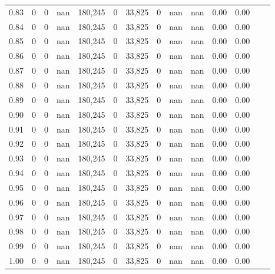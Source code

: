 \begin{tabular}{rrrrrrrrrrrrrr}
0.83 &      0 &      0 &     nan &  180,245 &        0 &  33,825 &       0 &   nan &   nan &  0.00 &      0.00 \\
0.84 &      0 &      0 &     nan &  180,245 &        0 &  33,825 &       0 &   nan &   nan &  0.00 &      0.00 \\
0.85 &      0 &      0 &     nan &  180,245 &        0 &  33,825 &       0 &   nan &   nan &  0.00 &      0.00 \\
0.86 &      0 &      0 &     nan &  180,245 &        0 &  33,825 &       0 &   nan &   nan &  0.00 &      0.00 \\
0.87 &      0 &      0 &     nan &  180,245 &        0 &  33,825 &       0 &   nan &   nan &  0.00 &      0.00 \\
0.88 &      0 &      0 &     nan &  180,245 &        0 &  33,825 &       0 &   nan &   nan &  0.00 &      0.00 \\
0.89 &      0 &      0 &     nan &  180,245 &        0 &  33,825 &       0 &   nan &   nan &  0.00 &      0.00 \\
0.90 &      0 &      0 &     nan &  180,245 &        0 &  33,825 &       0 &   nan &   nan &  0.00 &      0.00 \\
0.91 &      0 &      0 &     nan &  180,245 &        0 &  33,825 &       0 &   nan &   nan &  0.00 &      0.00 \\
0.92 &      0 &      0 &     nan &  180,245 &        0 &  33,825 &       0 &   nan &   nan &  0.00 &      0.00 \\
0.93 &      0 &      0 &     nan &  180,245 &        0 &  33,825 &       0 &   nan &   nan &  0.00 &      0.00 \\
0.94 &      0 &      0 &     nan &  180,245 &        0 &  33,825 &       0 &   nan &   nan &  0.00 &      0.00 \\
0.95 &      0 &      0 &     nan &  180,245 &        0 &  33,825 &       0 &   nan &   nan &  0.00 &      0.00 \\
0.96 &      0 &      0 &     nan &  180,245 &        0 &  33,825 &       0 &   nan &   nan &  0.00 &      0.00 \\
0.97 &      0 &      0 &     nan &  180,245 &        0 &  33,825 &       0 &   nan &   nan &  0.00 &      0.00 \\
0.98 &      0 &      0 &     nan &  180,245 &        0 &  33,825 &       0 &   nan &   nan &  0.00 &      0.00 \\
0.99 &      0 &      0 &     nan &  180,245 &        0 &  33,825 &       0 &   nan &   nan &  0.00 &      0.00 \\
1.00 &      0 &      0 &     nan &  180,245 &        0 &  33,825 &       0 &   nan &   nan &  0.00 &      0.00 \\
\bottomrule
\end{tabular}
